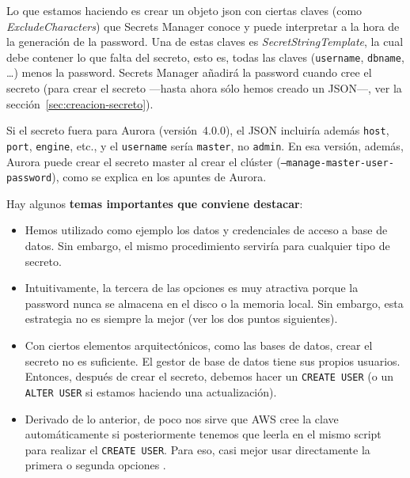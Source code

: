\documentclass[11pt,a4paper]{article}
\begin{document}
\begin{enumerate}
\vspace{1em}

Lo que estamos haciendo es crear un objeto json con ciertas claves (como \textit{ExcludeCharacters}) que Secrets Manager conoce y puede interpretar a la hora de la generación de la password. Una de estas claves es \textit{SecretStringTemplate}, la cual debe contener lo que falta del secreto, esto es, todas las claves (\texttt{username}, \texttt{dbname}, \ldots) menos la password. Secrets Manager añadirá la password cuando cree el secreto (para crear el secreto ---hasta ahora sólo hemos creado un JSON---, ver la sección~\ref{sec:creacion-secreto}).

Si el secreto fuera para Aurora (versión~4.0.0), el JSON incluiría además \texttt{host}, \texttt{port}, \texttt{engine}, etc., y el \texttt{username} sería \texttt{master}, no \texttt{admin}. En esa versión, además, Aurora puede crear el secreto master al crear el clúster (\texttt{--manage-master-user-password}), como se explica en los apuntes de Aurora.

\end{enumerate}

Hay algunos \textbf{temas importantes que conviene destacar}:
\begin{itemize}
    \item Hemos utilizado como ejemplo los datos y credenciales de acceso a base de datos. Sin embargo, el mismo procedimiento serviría para cualquier tipo de secreto.

    \item Intuitivamente, la tercera de las opciones es muy atractiva porque la password nunca se almacena en el disco o la memoria local. Sin embargo, esta estrategia no es siempre la mejor (ver los dos puntos siguientes).

    \item Con ciertos elementos arquitectónicos, como las bases de datos, crear el secreto no es suficiente. El gestor de base de datos tiene sus propios usuarios. Entonces, después de crear el secreto, debemos hacer un \texttt{CREATE USER} (o un \texttt{ALTER USER} si estamos haciendo una actualización).

    \item Derivado de lo anterior, de poco nos sirve que AWS cree la clave automáticamente si posteriormente tenemos que leerla en el mismo script para realizar el \texttt{CREATE USER}. Para eso, casi mejor usar directamente la primera o segunda opciones%
    .%
    
\end{itemize}
\end{document}
